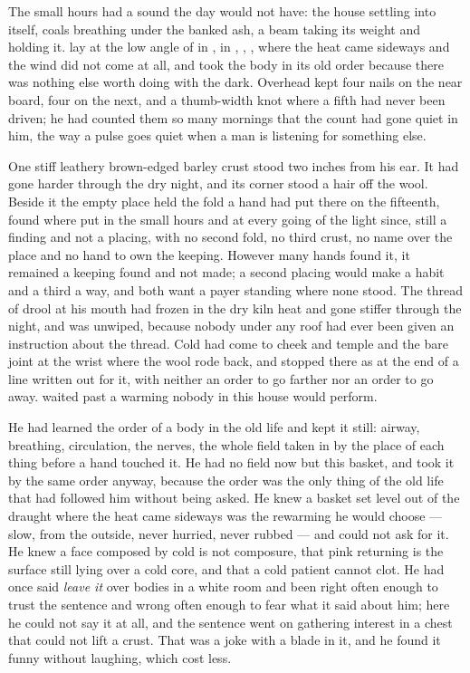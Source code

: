 
The small hours had a sound the day would not have: the house settling into itself, coals breathing under the banked ash, a beam taking its weight and holding it.  lay at the low angle of  in , in , , , where the heat came sideways and the wind did not come at all, and took the body in its old order because there was nothing else worth doing with the dark. Overhead  kept four nails on the near board, four on the next, and a thumb-width knot where a fifth had never been driven; he had counted them so many mornings that the count had gone quiet in him, the way a pulse goes quiet when a man is listening for something else.

One stiff leathery brown-edged barley crust stood two inches from his ear. It had gone harder through the dry night, and its corner stood a hair off the wool. Beside it the empty place held the fold a hand had put there on the fifteenth, found where put in the small hours and at every going of the light since, still a finding and not a placing, with no second fold, no third crust, no name over the place and no hand to own the keeping. However many hands found it, it remained a keeping found and not made; a second placing would make a habit and a third a way, and both want a payer standing where none stood. The thread of drool at his mouth had frozen in the dry kiln heat and gone stiffer through the night, and was unwiped, because nobody under any roof had ever been given an instruction about the thread. Cold had come to cheek and temple and the bare joint at the wrist where the wool rode back, and stopped there as at the end of a line written out for it, with neither an order to go farther nor an order to go away.  waited past a warming nobody in this house would perform.

He had learned the order of a body in the old life and kept it still: airway, breathing, circulation, the nerves, the whole field taken in by the place of each thing before a hand touched it. He had no field now but this basket, and took it by the same order anyway, because the order was the only thing of the old life that had followed him without being asked. He knew a basket set level out of the draught where the heat came sideways was the rewarming he would choose --- slow, from the outside, never hurried, never rubbed --- and could not ask for it. He knew a face composed by cold is not composure, that pink returning is the surface still lying over a cold core, and that a cold patient cannot clot. He had once said \emph{leave it} over bodies in a white room and been right often enough to trust the sentence and wrong often enough to fear what it said about him; here he could not say it at all, and the sentence went on gathering interest in a chest that could not lift a crust. That was a joke with a blade in it, and he found it funny without laughing, which cost less.

